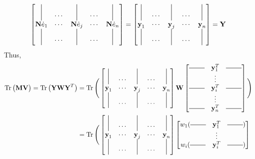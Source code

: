 \begin{notechapter}
\begin{align*}
\begin{bmatrix*}
        \vertbar & \cdots & \vertbar & \cdots & \vertbar\\
        \textbf{N}\dot{e}_{1} & \cdots & \textbf{N}\dot{e}_{j} & \cdots & \textbf{N}\dot{e}_{n}\\
        \vertbar & \cdots & \vertbar & \cdots & \vertbar
    \end{bmatrix*}
    =
    \begin{bmatrix*}
        \vertbar & \cdots & \vertbar & \cdots & \vertbar\\
        {\textbf{y}}_{1} & \cdots & {\textbf{y}}_{j} & \cdots & {\textbf{y}}_{n}\\
        \vertbar & \cdots & \vertbar & \cdots & \vertbar
    \end{bmatrix*}
    = \textbf{Y}
\end{align*}
%
Thus, 
\begin{align*}
    \Tr\big(\textbf{M} \textbf{V} \big) = \Tr \big(\textbf{Y} \textbf{W} \textbf{Y}^T \big) &=
    \Tr \Bigg( \begin{bmatrix*}
        \vertbar & \cdots & \vertbar & \cdots & \vertbar\\
        {\textbf{y}}_{1} & \cdots & {\textbf{y}}_{j} & \cdots & {\textbf{y}}_{n}\\
        \vertbar & \cdots & \vertbar & \cdots & \vertbar
    \end{bmatrix*} 
    \textbf{W} 
    \begin{bmatrix*}
        \horzbar &\textbf{y}_{1}^T& \horzbar\\
        &\vdots&\\
        \horzbar &\textbf{y}_{i}^T& \horzbar\\
        &\vdots&\\
        \horzbar &\textbf{y}_{n}^T& \horzbar
    \end{bmatrix*}\Bigg) \\
    &= \Tr \Bigg( \begin{bmatrix*}
        \vertbar & \cdots & \vertbar & \cdots & \vertbar\\
        {\textbf{y}}_{1} & \cdots & {\textbf{y}}_{j} & \cdots & {\textbf{y}}_{n}\\
        \vertbar & \cdots & \vertbar & \cdots & \vertbar
    \end{bmatrix*} 
    \begin{bmatrix*}
        w_1(\horzbar &\textbf{y}_{1}^T& \horzbar)\\
        &\vdots&\\
        w_i(\horzbar &\textbf{y}_{i}^T& \horzbar)\\

\end{bmatrix*}
\end{align*}
\end{notechapter}
